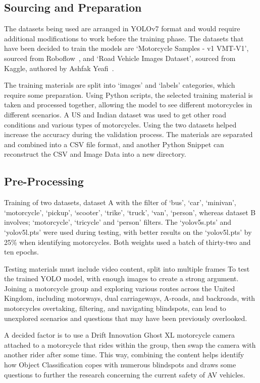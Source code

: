 \documentclass[conference]{IEEEtran}
\begin{document}
	\subsection{Sourcing and Preparation}
		The datasets being used are arranged in YOLOv7 format and would require additional modifications to work before the training phase. The datasets that have been decided to train the models are `Motorcycle Samples - v1 VMT-V1', sourced from Roboflow~\cite{roboflow_motorcycle_nodate}, and `Road Vehicle Images Dataset', sourced from Kaggle, authored by Ashfak Yeafi~\cite{ashfak_yeafi_road_nodate}.

		The training materials are split into `images' and `labels' categories, which require some preparation. Using Python scripts, the selected training material is taken and processed together, allowing the model to see different motorcycles in different scenarios. A US and Indian dataset was used to get other road conditions and various types of motorcycles. Using the two datasets helped increase the accuracy during the validation process. The materials are separated and combined into a CSV file format, and another Python Snippet can reconstruct the CSV and Image Data into a new directory.

	\subsection{Pre-Processing}
	\label{subsec:preprocessing}
		Training of two datasets, dataset A with the filter of `bus', `car', `minivan', `motorcycle', `pickup', `scooter', `trike', `truck', `van', `person', whereas dataset B involves; `motorcycle', `tricycle' and `person' filters. The `yolov5s.pts' and `yolov5l.pts' were used during testing, with better results on the `yolov5l.pts' by 25\% when identifying motorcycles. Both weights used a batch of thirty-two and ten epochs.

		Testing materials must include video content, split into multiple frames To test the trained YOLO model, with enough images to create a strong argument. Joining a motorcycle group and exploring various routes across the United Kingdom, including motorways, dual carriageways, A-roads, and backroads, with motorcycles overtaking, filtering, and navigating blindspots, can lead to unexplored scenarios and questions that may have been previously overlooked.
					
		A decided factor is to use a Drift Innovation Ghost XL motorcycle camera attached to a motorcycle that rides within the group, then swap the camera with another rider after some time. This way, combining the content helps identify how Object Classification copes with numerous blindspots and draws some questions to further the research concerning the current safety of AV vehicles. 
		
\end{document}
